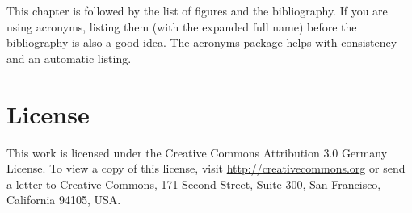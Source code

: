 \documentclass[a4paper,twoside, openright,12pt]{report}
\begin{document}
This chapter is followed by the list of figures and the bibliography. If you are using acronyms, listing them (with the expanded full name) before the bibliography is also a good idea. The acronyms package helps with consistency and an automatic listing.




\cleardoublepage
{} 
\listoffigures 	 %


\cleardoublepage
{}




\cleardoublepage
\chapter*{License}
This work is licensed under the Creative Commons Attribution 3.0 Germany
License. To view a copy of this license,
visit \href{http://creativecommons.org/licenses/by/3.0/de/}{http://creativecommons.org} or send a letter
to Creative Commons, 171 Second Street, Suite 300, San
Francisco, California 94105, USA.
\end{document}
